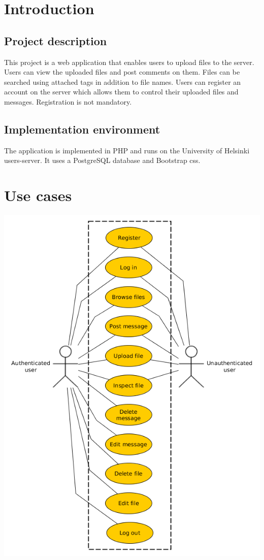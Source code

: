 \documentclass[10pt,a4paper]{article}
\begin{document}
\section{Introduction}
\subsection{Project description}
This project is a web application that enables users to upload files to the server. Users can view the uploaded files and post comments on them. Files can be searched using attached tags in addition to file names. Users can register an account on the server which allows them to control their uploaded files and messages. Registration is not mandatory.

\subsection{Implementation environment}
The application is implemented in PHP and runs on the University of Helsinki users-server. It uses a PostgreSQL database and Bootstrap css.

\section{Use cases}
\includegraphics[scale=0.5]{diagrams/use_case.png}
\end{document}

